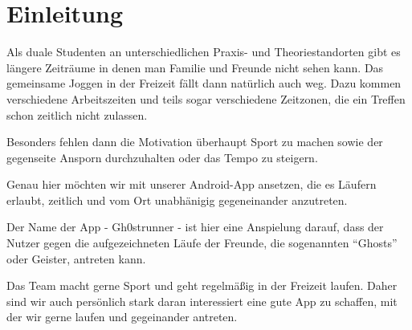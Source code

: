 \section{Einleitung}\label{einleitung}
Als duale Studenten an unterschiedlichen Praxis- und Theoriestandorten gibt es längere Zeiträume in denen man Familie und Freunde nicht sehen kann. Das gemeinsame Joggen in der Freizeit fällt dann natürlich auch weg. Dazu kommen verschiedene Arbeitszeiten und teils sogar verschiedene Zeitzonen, die ein Treffen schon zeitlich nicht zulassen. 

Besonders fehlen dann die Motivation überhaupt Sport zu machen sowie der gegenseite Ansporn durchzuhalten oder das Tempo zu steigern. 

Genau hier möchten wir mit unserer Android-App ansetzen, die es Läufern erlaubt, zeitlich und vom Ort unabhänigig gegeneinander anzutreten.

Der Name der App - Gh0strunner - ist hier eine Anspielung darauf, dass der Nutzer gegen die aufgezeichneten Läufe der Freunde, die sogenannten ``Ghosts'' oder Geister, antreten kann.

Das Team macht gerne Sport und geht regelmäßig in der Freizeit laufen. Daher sind wir auch persönlich stark daran interessiert eine gute App zu schaffen, mit der wir gerne laufen und gegeinander antreten.
